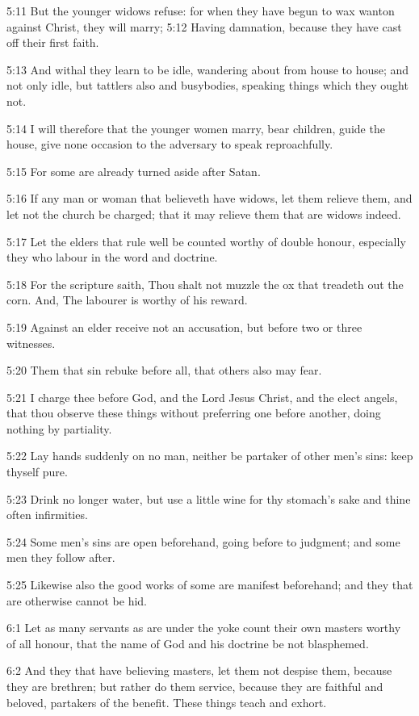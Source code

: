 5:11 But the younger widows refuse: for when they have begun to wax wanton against Christ, they will marry; 5:12 Having damnation, because they have cast off their first faith.

5:13 And withal they learn to be idle, wandering about from house to house; and not only idle, but tattlers also and busybodies, speaking things which they ought not.

5:14 I will therefore that the younger women marry, bear children, guide the house, give none occasion to the adversary to speak reproachfully.

5:15 For some are already turned aside after Satan.

5:16 If any man or woman that believeth have widows, let them relieve them, and let not the church be charged; that it may relieve them that are widows indeed.

5:17 Let the elders that rule well be counted worthy of double honour, especially they who labour in the word and doctrine.

5:18 For the scripture saith, Thou shalt not muzzle the ox that treadeth out the corn. And, The labourer is worthy of his reward.

5:19 Against an elder receive not an accusation, but before two or three witnesses.

5:20 Them that sin rebuke before all, that others also may fear.

5:21 I charge thee before God, and the Lord Jesus Christ, and the elect angels, that thou observe these things without preferring one before another, doing nothing by partiality.

5:22 Lay hands suddenly on no man, neither be partaker of other men's sins: keep thyself pure.

5:23 Drink no longer water, but use a little wine for thy stomach's sake and thine often infirmities.

5:24 Some men's sins are open beforehand, going before to judgment; and some men they follow after.

5:25 Likewise also the good works of some are manifest beforehand; and they that are otherwise cannot be hid.

6:1 Let as many servants as are under the yoke count their own masters worthy of all honour, that the name of God and his doctrine be not blasphemed.

6:2 And they that have believing masters, let them not despise them, because they are brethren; but rather do them service, because they are faithful and beloved, partakers of the benefit. These things teach and exhort.

